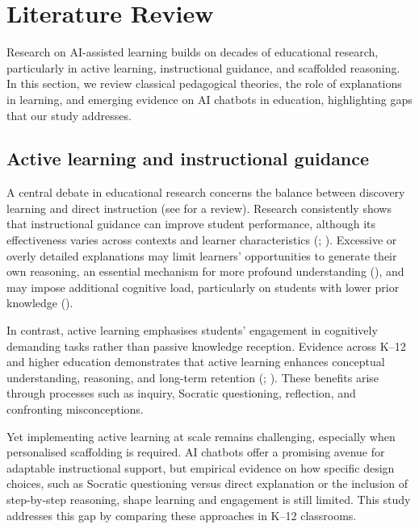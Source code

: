 \documentclass[
  11pt,
]{article}
\begin{document}
\section{Literature Review}\label{literature-review}

Research on AI-assisted learning builds on decades of educational research, particularly in active learning, instructional guidance, and scaffolded reasoning. In this section, we review classical pedagogical theories, the role of explanations in learning, and emerging evidence on AI chatbots in education, highlighting gaps that our study addresses.

\subsection{Active learning and instructional guidance}\label{active-learning-and-instructional-guidance}

A central debate in educational research concerns the balance between discovery learning and direct instruction (see  for a review). Research consistently shows that instructional guidance can improve student performance, although its effectiveness varies across contexts and learner characteristics (; ). Excessive or overly detailed explanations may limit learners' opportunities to generate their own reasoning, an essential mechanism for more profound understanding (), and may impose additional cognitive load, particularly on students with lower prior knowledge ().

In contrast, active learning emphasises students' engagement in cognitively demanding tasks rather than passive knowledge reception. Evidence across K--12 and higher education demonstrates that active learning enhances conceptual understanding, reasoning, and long-term retention (; ). These benefits arise through processes such as inquiry, Socratic questioning, reflection, and confronting misconceptions.

Yet implementing active learning at scale remains challenging, especially when personalised scaffolding is required. AI chatbots offer a promising avenue for adaptable instructional support, but empirical evidence on how specific design choices, such as Socratic questioning versus direct explanation or the inclusion of step-by-step reasoning, shape learning and engagement is still limited. This study addresses this gap by comparing these approaches in K--12 classrooms.
\end{document}
